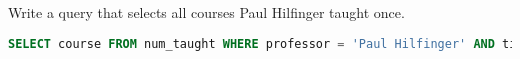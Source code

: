 \question Write a query that selects all courses Paul Hilfinger taught once.

\begin{solution}[0.25in]
\begin{lstlisting}[language=SQL]
SELECT course FROM num_taught WHERE professor = 'Paul Hilfinger' AND times = 1;
\end{lstlisting}
\end{solution}
